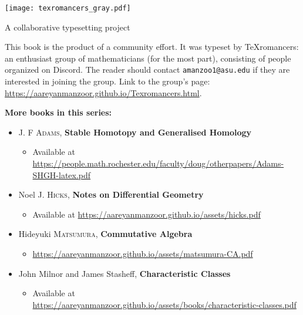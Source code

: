 \documentclass[../main]{subfiles}
\begin{document}

\newpage
\thispagestyle{empty}

\begin{center}
    \Huge{
    \texttt{[image: texromancers\_gray.pdf]}
    }
    
    \normalsize{A collaborative typesetting project}
\end{center}

\noindent\makebox[\linewidth]{\rule{\linewidth}{0.4pt}}

\bigskip

This book is the product of a community effort. It was typeset by \linebreak\TeX{}romancers: an enthusiast group of mathematicians (for the most part), consisting of people organized on Discord. The reader should contact \linebreak\texttt{amanzoo1@asu.edu} if they are interested in joining the group. Link to the group's page: \url{https://aareyanmanzoor.github.io/Texromancers.html}.

\noindent\makebox[\linewidth]{\rule{\linewidth}{0.4pt}}

\bigskip

\noindent\textbf{More books in this series:}
\begin{itemize}
    \item J. F \textsc{Adams}, \textbf{Stable Homotopy and Generalised Homology}
        \begin{itemize}
            \item Available at \url{https://people.math.rochester.edu/faculty/doug/otherpapers/Adams-SHGH-latex.pdf}
        \end{itemize}
    \item Noel J. \textsc{Hicks}, \textbf{Notes on Differential Geometry}
        \begin{itemize}
            \item Available at \url{https://aareyanmanzoor.github.io/assets/hicks.pdf}
        \end{itemize}
    \item Hideyuki \textsc{Matsumura}, \textbf{Commutative Algebra}
        \begin{itemize}
            \item \url{https://aareyanmanzoor.github.io/assets/matsumura-CA.pdf}
        \end{itemize}
    \item John Milnor and James Stasheff, \textbf{Characteristic Classes}
    \begin{itemize}
        \item Available at \url{https://aareyanmanzoor.github.io/assets/books/characteristic-classes.pdf}
    \end{itemize}
\end{itemize}

\vfill
\end{document}
